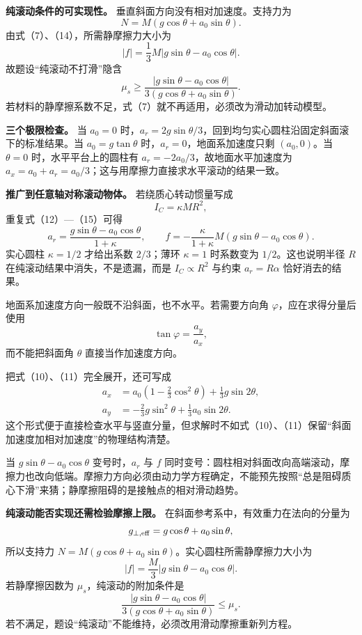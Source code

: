 \documentclass[12pt,a4paper,UTF8]{ctexart}
\begin{document}
\textbf{纯滚动条件的可实现性。} 垂直斜面方向没有相对加速度。支持力为 \[
N=M(g\cos\theta+a_0\sin\theta). \tag{16}
\] 由式（7）、（14），所需静摩擦力大小为 \[
|f|=\frac13M|g\sin\theta-a_0\cos\theta|. \tag{17}
\] 故题设``纯滚动不打滑''隐含 \[
\mu_s\ge
\frac{|g\sin\theta-a_0\cos\theta|}
{3(g\cos\theta+a_0\sin\theta)}. \tag{18}
\] 若材料的静摩擦系数不足，式（7）就不再适用，必须改为滑动加转动模型。

\textbf{三个极限检查。} 当 \(a_0=0\)
时，\(a_r=2g\sin\theta/3\)，回到均匀实心圆柱沿固定斜面滚下的标准结果。当
\(a_0=g\tan\theta\) 时，\(a_r=0\)，地面系加速度只剩 \((a_0,0)\)。当
\(\theta=0\) 时，水平平台上的圆柱有 \(a_r=-2a_0/3\)，故地面水平加速度为
\(a_x=a_0+a_r=a_0/3\)；这与用摩擦力直接求水平滚动的结果一致。

\textbf{推广到任意轴对称滚动物体。} 若绕质心转动惯量写成 \[
I_C=\kappa MR^2, \tag{19}
\] 重复式（12）---（15）可得 \[
a_r=\frac{g\sin\theta-a_0\cos\theta}{1+\kappa},
\qquad
f=-\frac{\kappa}{1+\kappa}M
(g\sin\theta-a_0\cos\theta). \tag{20}
\] 实心圆柱 \(\kappa=1/2\) 才给出系数 \(2/3\)；薄环 \(\kappa=1\)
时系数变为 \(1/2\)。这也说明半径 \(R\)
在纯滚动结果中消失，不是遗漏，而是 \(I_C\propto R^2\) 与约束
\(a_r=R\alpha\) 恰好消去的结果。

地面系加速度方向一般既不沿斜面，也不水平。若需要方向角
\(\varphi\)，应在求得分量后使用 \[
\tan\varphi=\frac{a_y}{a_x}, \tag{21}
\] 而不能把斜面角 \(\theta\) 直接当作加速度方向。

把式（10）、（11）完全展开，还可写成 \[
\begin{aligned}
a_x
&=a_0\left(1-\frac23\cos^2\theta\right)
+\frac13g\sin2\theta,\\
a_y
&=-\frac23g\sin^2\theta
+\frac13a_0\sin2\theta.
\end{aligned} \tag{22}
\]
这个形式便于直接检查水平与竖直分量，但求解时不如式（10）、（11）保留``斜面加速度加相对加速度''的物理结构清楚。

当 \(g\sin\theta-a_0\cos\theta\) 变号时，\(a_r\) 与 \(f\)
同时变号：圆柱相对斜面改向高端滚动，摩擦力也改向低端。摩擦力方向必须由动力学方程确定，不能预先按照``总是阻碍质心下滑''来猜；静摩擦阻碍的是接触点的相对滑动趋势。

\textbf{纯滚动能否实现还需检验摩擦上限。}
在斜面参考系中，有效重力在法向的分量为 \[
g_{\perp,\rm eff}=g\cos\theta+a_0\sin\theta,
\] 所以支持力
\(N=M(g\cos\theta+a_0\sin\theta)\)。实心圆柱所需静摩擦力大小为 \[
|f|=\frac M3
|g\sin\theta-a_0\cos\theta|.
\] 若静摩擦因数为 \(\mu_s\)，纯滚动的附加条件是 \[
\boxed{
\frac{|g\sin\theta-a_0\cos\theta|}
{3(g\cos\theta+a_0\sin\theta)}
\le\mu_s
}.
\] 若不满足，题设``纯滚动''不能维持，必须改用滑动摩擦重新列方程。
\end{document}
